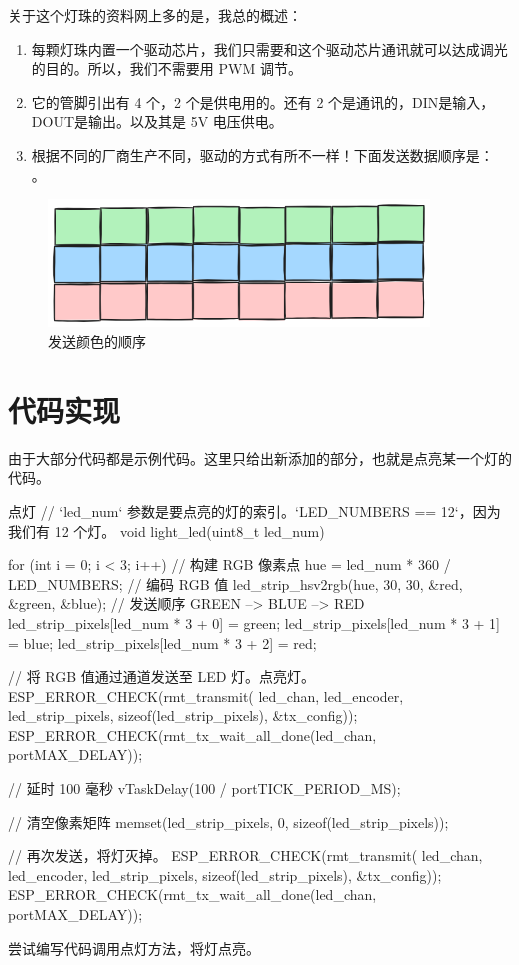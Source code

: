 \documentclass[lang=cn,newtx,10pt,scheme=chinese]{elegantbook}
\begin{document}
关于这个灯珠的资料网上多的是，我总的概述：

\begin{enumerate}
\item 每颗灯珠内置一个驱动芯片，我们只需要和这个驱动芯片通讯就可以达成调光的目的。所以，我们不需要用 PWM 调节。
\item 它的管脚引出有 4 个，2 个是供电用的。还有 2 个是通讯的，DIN是输入，DOUT是输出。以及其是 5V 电压供电。
\item 根据不同的厂商生产不同，驱动的方式有所不一样！下面发送数据顺序是： 。
\end{enumerate}

\begin{figure}[!htb]
\centering
\includegraphics[width=0.9\textwidth]{rmt-rgb.png}
\caption{发送颜色的顺序}
\end{figure}

\section{代码实现}

由于大部分代码都是示例代码。这里只给出新添加的部分，也就是点亮某一个灯的代码。

\begin{mycode}{点灯}
// `led_num` 参数是要点亮的灯的索引。`LED_NUMBERS == 12`，因为我们有 12 个灯。
void light_led(uint8_t led_num)
{
    for (int i = 0; i < 3; i++)
    {
        // 构建 RGB 像素点
        hue = led_num * 360 / LED_NUMBERS;
        // 编码 RGB 值
        led_strip_hsv2rgb(hue, 30, 30, &red, &green, &blue);
        // 发送顺序 GREEN --> BLUE --> RED
        led_strip_pixels[led_num * 3 + 0] = green;
        led_strip_pixels[led_num * 3 + 1] = blue;
        led_strip_pixels[led_num * 3 + 2] = red;
    }

    // 将 RGB 值通过通道发送至 LED 灯。点亮灯。
    ESP_ERROR_CHECK(rmt_transmit(
        led_chan,
        led_encoder,
        led_strip_pixels,
        sizeof(led_strip_pixels),
        &tx_config));
    ESP_ERROR_CHECK(rmt_tx_wait_all_done(led_chan, portMAX_DELAY));

    // 延时 100 毫秒
    vTaskDelay(100 / portTICK_PERIOD_MS);

    // 清空像素矩阵
    memset(led_strip_pixels, 0, sizeof(led_strip_pixels));

    // 再次发送，将灯灭掉。
    ESP_ERROR_CHECK(rmt_transmit(
        led_chan,
        led_encoder,
        led_strip_pixels,
        sizeof(led_strip_pixels),
        &tx_config));
    ESP_ERROR_CHECK(rmt_tx_wait_all_done(led_chan, portMAX_DELAY));
}
\end{mycode}

尝试编写代码调用点灯方法，将灯点亮。
\end{document}
